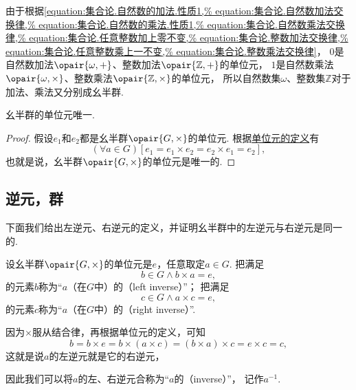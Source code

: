 由于根据\cref{equation:集合论.自然数的加法.性质1,%
equation:集合论.自然数加法交换律,%
equation:集合论.自然数的乘法.性质1,%
equation:集合论.自然数乘法交换律,%
equation:集合论.任意整数加上零不变,%
equation:集合论.整数加法交换律,%
equation:集合论.任意整数乘上一不变,%
equation:集合论.整数乘法交换律}，
\(0\)是自然数加法\(\opair{\omega,+}\)、整数加法\(\opair{\mathbb{Z},+}\)的单位元，
\(1\)是自然数乘法\(\opair{\omega,\times}\)、整数乘法\(\opair{\mathbb{Z},\times}\)的单位元，
所以自然数集\(\omega\)、整数集\(\mathbb{Z}\)对于加法、乘法又分别成幺半群.

\begin{theorem}\label{theorem:抽象代数.幺半群的单位元唯一}
幺半群的单位元唯一.
\begin{proof}
假设\(e_1\)和\(e_2\)都是幺半群\(\opair{G,\times}\)的单位元.
根据\hyperref[definition:抽象代数.幺半群的定义]{单位元的定义}有\begin{equation*}
	(\forall a \in G)[
		e_1 = e_1 \times e_2 = e_2 \times e_1 = e_2
	],
\end{equation*}
也就是说，幺半群\(\opair{G,\times}\)的单位元是唯一的.
\end{proof}
\end{theorem}

\subsection{逆元，群}
下面我们给出左逆元、右逆元的定义，并证明幺半群中的左逆元与右逆元是同一的.

设幺半群\(\opair{G,\times}\)的单位元是\(e\)，任意取定\(a \in G\).
把满足\begin{equation*}
	b \in G
	\land
	b \times a = e,
\end{equation*}的元素\(b\)称为“\(a\)（在\(G\)中）的（left inverse）”；
把满足\begin{equation*}
	c \in G
	\land
	a \times c = e,
\end{equation*}的元素\(c\)称为“\(a\)（在\(G\)中）的（right inverse）”.

因为\(\times\)服从结合律，再根据单位元的定义，可知\begin{equation*}
	b = b \times e = b \times (a \times c) = (b \times a) \times c = e \times c = c,
\end{equation*}
这就是说\(a\)的左逆元就是它的右逆元，

因此我们可以将\(a\)的左、右逆元合称为“\(a\)的（inverse）”，
记作\(a^{-1}\).

